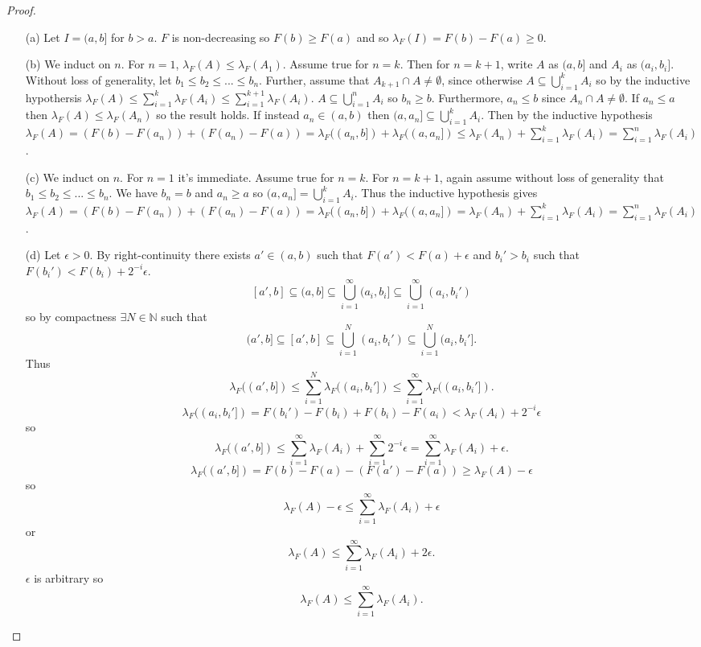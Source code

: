 \documentclass{article}
\begin{document}
\begin{proof}
\begin{enumerate}
    \item[(a)] Let $I=(a,b]$ for $b>a$. $F$ is non-decreasing so $F(b)\geq F(a)$ and so $\lambda_F(I)=F(b)-F(a)\geq0$.
    \item[(b)] We induct on $n$. For $n=1$, $\lambda_F(A)\leq\lambda_F(A_1)$. Assume true for $n=k$. Then for $n=k+1$, write $A$ as $(a,b]$ and $A_i$ as $(a_i,b_i]$. Without loss of generality, let $b_1\leq b_2\leq...\leq b_n$. Further, assume that $A_{k+1}\cap A\neq\emptyset$, since otherwise $A\subseteq\bigcup_{i=1}^k A_i$ so by the inductive hypothersis $\lambda_F(A)\leq\sum_{i=1}^k\lambda_F(A_i)\leq\sum_{i=1}^{k+1}\lambda_F(A_i)$. $A\subseteq\bigcup_{i=1}^n A_i$ so $b_n\geq b$. Furthermore, $a_n\leq b$ since $A_n\cap A\neq\emptyset$. If $a_n\leq a$ then $\lambda_F(A)\leq\lambda_F(A_n)$ so the result holds. If instead $a_n\in(a,b)$ then $(a,a_n]\subseteq\bigcup_{i=1}^k A_i$. Then by the inductive hypothesis $\lambda_F(A)=(F(b)-F(a_n))+(F(a_n)-F(a))=\lambda_F((a_n,b])+\lambda_F((a,a_n])\leq\lambda_F(A_n)+\sum_{i=1}^k\lambda_F(A_i)=\sum_{i=1}^n\lambda_F(A_i)$.
    \item[(c)] We induct on $n$. For $n=1$ it's immediate. Assume true for $n=k$. For $n=k+1$, again assume without loss of generality that $b_1\leq b_2\leq...\leq b_n$. We have $b_n=b$ and $a_n\geq a$ so $(a,a_n]=\bigcup_{i=1}^kA_i$. Thus the inductive hypothesis gives $\lambda_F(A)=(F(b)-F(a_n))+(F(a_n)-F(a))=\lambda_F((a_n,b])+\lambda_F((a,a_n])=\lambda_F(A_n)+\sum_{i=1}^k\lambda_F(A_i)=\sum_{i=1}^n\lambda_F(A_i)$.
    \item[(d)] Let $\epsilon>0$. By right-continuity there exists $a'\in(a,b)$ such that $F(a')<F(a)+\epsilon$ and $b_i'>b_i$ such that $F(b_i')<F(b_i)+2^{-i}\epsilon$.
    \[[a',b]\subseteq(a,b]\subseteq\bigcup_{i=1}^\infty(a_i,b_i]\subseteq\bigcup_{i=1}^\infty(a_i,b_i')\] so by compactness $\exists N\in\mathbb{N}$ such that \[(a',b]\subseteq[a',b]\subseteq\bigcup_{i=1}^N(a_i,b_i')\subseteq\bigcup_{i=1}^N(a_i,b_i'].\] Thus \[\lambda_F((a',b])\leq\sum_{i=1}^N\lambda_F((a_i,b_i'])\leq\sum_{i=1}^\infty\lambda_F((a_i,b_i']).\] \[\lambda_F((a_i,b_i'])=F(b_i')-F(b_i)+F(b_i)-F(a_i)<\lambda_F(A_i)+2^{-i}\epsilon\] so \[\lambda_F((a',b])\leq\sum_{i=1}^\infty\lambda_F(A_i)+\sum_{i=1}^\infty2^{-i}\epsilon=\sum_{i=1}^\infty\lambda_F(A_i) + \epsilon.\] \[\lambda_F((a',b])=F(b)-F(a)-(F(a')-F(a))\geq\lambda_F(A)-\epsilon\] so \[\lambda_F(A)-\epsilon\leq\sum_{i=1}^\infty\lambda_F(A_i)+\epsilon\] or \[\lambda_F(A)\leq\sum_{i=1}^\infty\lambda_F(A_i) +2\epsilon.\] $\epsilon$ is arbitrary so \[\lambda_F(A)\leq\sum_{i=1}^\infty\lambda_F(A_i).\]
\end{enumerate}
\end{proof}
\end{document}
